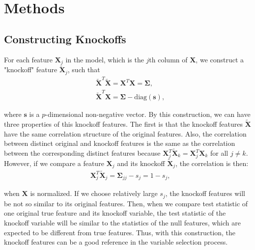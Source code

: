 \documentclass{uwstat572}
\begin{document}
\section{Methods}
\subsection{Constructing Knockoffs}
For each feature $\bm{X}_j$ in the model, which is the $j$th column of $\bm{X}$, we construct a "knockoff" feature $\bm{\tilde X}_j$, such that 
\begin{align*}
& \tilde {\bm{X}}^T\tilde {\bm{X}} = \bm{X}^T\bm{X} = \bm{\Sigma}, \\
& \tilde {\bm{X}}^T\bm{X} = \bm{\Sigma} - \text{diag}{(\bm{s})},
\end{align*}

where $\bm{s}$ is a $p$-dimensional non-negative vector. By this construction, we can have three properties of this knockoff features. The first is that the knockoff features $\bm{\tilde{X}}$ have the same correlation structure of the original features. Also, the correlation between distinct original and knockoff features is the same as the correlation between the corresponding distinct features because $\bm{X}_j^T\tilde{\bm{X}}_k = \bm{X}_j^T\bm{X}_k$ for all $j\neq k$. However, if we compare a feature $\bm{X}_j$ and its knockoff $\bm{\tilde X}_j$, the correlation is then:
\begin{align*}
& \bm{X}_j^T\tilde{\bm{X}}_j = \bm{\Sigma}_{jj} - s_j = 1-s_j,
\end{align*}

when $\bm{X}$ is normalized. If we choose relatively large $s_j$, the knockoff features will be not so similar to its original features. Then, when we compare test statistic of one original true feature and its knockoff variable, the test statistic of the knockoff variable will be similar to the statistics of the null features, which are expected to be different from true features. Thus, with this construction, the knockoff features can be a good reference in the variable selection process. 
\end{document}
